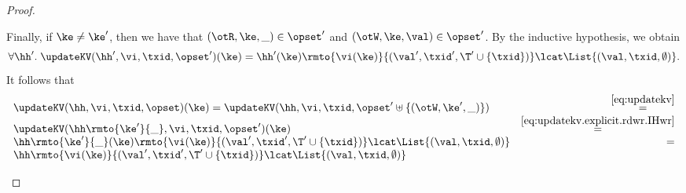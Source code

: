 \begin{proof}
\begin{enumerate}
\begin{itemize}
\[			\]
			Finally, if $\ke \neq \ke'$, then we have that $(\otR, \ke, \_) \in \opset'$ and $(\otW, \ke, \val) \in \opset'$. 
			By the inductive hypothesis, we obtain 
			\begin{equation}
			\forall \hh'.\;\updateKV(\hh', \vi, \txid, \opset')(\ke) = \hh'(\ke)\rmto{\vi(\ke)}{(\val', \txid', \T' \cup \{\txid\})} \lcat \List{(\val, \txid, \emptyset)}.
			\label{eq:updatekv.explicit.rdwr.IHwr}
			\end{equation}
			It follows that 
			\[
			\begin{array}{lr}
			\updateKV(\hh, \vi, \txid, \opset)(\ke) = \updateKV(\hh, \vi, \txid, \opset' \uplus \{(\otW, \ke', \_)\}) &\stackrel{\eqref{eq:updatekv}}{=}\\
			\updateKV(\hh\rmto{\ke'}{\_}, \vi, \txid, \opset')(\ke) &\stackrel{\eqref{eq:updatekv.explicit.rdwr.IHwr}}{=}\\
			\hh\rmto{\ke'}{\_}(\ke)\rmto{\vi(\ke)}{(\val', \txid', \T' \cup \{\txid\})} \lcat \List{(\val, \txid, \emptyset)} &=\\
			\hh\rmto{\vi(\ke)}{(\val', \txid', \T' \cup \{\txid\})} \lcat \List{(\val, \txid, \emptyset)}
			\end{array}
			\]
			\end{itemize}
\end{enumerate}
\end{proof}
%
